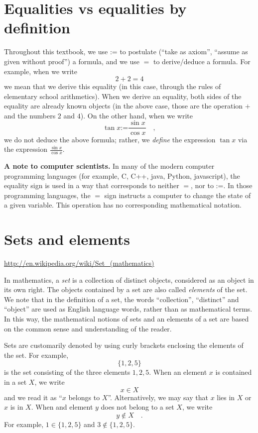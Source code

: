 \documentclass[12pt]{book}
\newcommand{\eqdef}{\textbf{:=}}
\begin{document}
\section{Equalities vs equalities by definition }
Throughout this textbook, we use $\eqdef$ to postulate (``take as axiom'', ``assume as given without proof'') a formula, and we use $=$ to derive/deduce a formula. For example, when we write 
\[ 2+2=4
\]
we mean that we derive this equality (in this case, through the rules of elementary school arithmetics). When we derive an equality, both sides of the equality are already known objects (in the above case, those are the operation $+$ and the numbers $2$ and $4$).  On the other hand, when we write 
\[
\tan x\eqdef\frac{\sin x}{\cos x}\quad ,
\]
we do not deduce the above formula; rather, we \emph{define} the expression $\tan x$ via the expression $\displaystyle\frac{\sin x}{\cos x}$.

\textbf{A note to computer scientists. } In many of the modern computer programming languages (for example, C, C++, java, Python, javascript), the equality sign is used in a way that corresponds to neither $=$, nor to $\eqdef$. In those programming languages, the $=$ sign instructs a computer to change the state of a given variable. This operation has no corresponding mathematical notation. 
\section{Sets and elements}
\url{http://en.wikipedia.org/wiki/Set_(mathematics)}

In mathematics, a \emph{set} is a collection of distinct objects, considered as an object in its own right. The objects contained by a set are also called \emph{elements} of the set. We note that in the definition of a set, the words ``collection'', ``distinct'' and ``object'' are used as English language words, rather than as mathematical terms. In this way, the mathematical notions of sets and an elements of a set are based on the common sense and understanding of the reader. 

Sets are customarily denoted by using curly brackets enclosing the elements of the set. For example,
\[
\{1,2,5\}
\]
is the set consisting of the three elements $1,2,5$. When an element $x$ is contained in a set $X$, we write 
\[
x\in X
\]
and we read it as ``$x$ belongs to $X$''. Alternatively, we may say that $x$ lies in $X$ or $x$ is in $X$. When and element $y$ does not belong to a set $X$, we write 
\[
y\notin X\quad. 
\]
For example, $1\in \{1,2,5\}$ and $3\notin \{1,2,5\}$.
\end{document}
